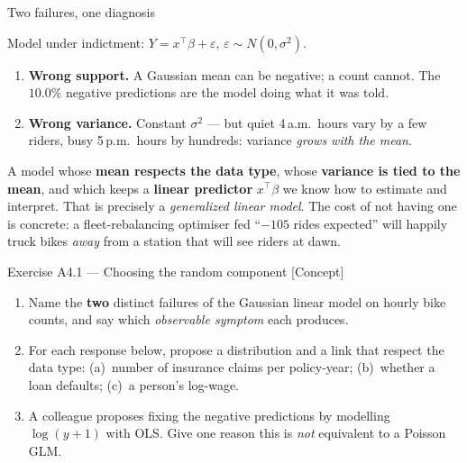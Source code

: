 \documentclass[aspectratio=169,11pt]{beamer}
\begin{document}
\begin{frame}{Two failures, one diagnosis}
  \footnotesize
  \begin{readme}
    Model under indictment: $Y = x^{\top}\beta + \varepsilon$,
    $\varepsilon\sim N(0,\sigma^2)$.
    \begin{enumerate}
      \item \textbf{Wrong support.} A Gaussian mean can be negative; a count cannot.
            The $10.0\%$ negative predictions are the model doing what it was told.
      \item \textbf{Wrong variance.} Constant $\sigma^2$ --- but quiet 4\,a.m.\ hours
            vary by a few riders, busy 5\,p.m.\ hours by hundreds: variance
            \emph{grows with the mean}.
    \end{enumerate}
  \end{readme}
  \begin{takeaway}
    A model whose \textbf{mean respects the data type}, whose \textbf{variance is tied
    to the mean}, and which keeps a \textbf{linear predictor} $x^{\top}\beta$ we know
    how to estimate and interpret. That is precisely a \emph{generalized linear model}.
    The cost of not having one is concrete: a fleet-rebalancing optimiser fed
    ``$-105$ rides expected'' will happily truck bikes \emph{away} from a station that
    will see riders at dawn.
  \end{takeaway}
\end{frame}

\begin{frame}{Exercise A4.1 --- Choosing the random component [Concept]}
\begin{exercise}
  \begin{enumerate}
    \item Name the \textbf{two} distinct failures of the Gaussian linear model on hourly
          bike counts, and say which \emph{observable symptom} each produces.
    \item For each response below, propose a distribution and a link that respect the
          data type: (a)~number of insurance claims per policy-year; (b)~whether a loan
          defaults; (c)~a person's log-wage.
    \item A colleague proposes fixing the negative predictions by modelling
          $\log(y+1)$ with OLS. Give one reason this is \emph{not} equivalent to a
          Poisson GLM.
  \end{enumerate}
\end{exercise}
\end{frame}
\end{document}
